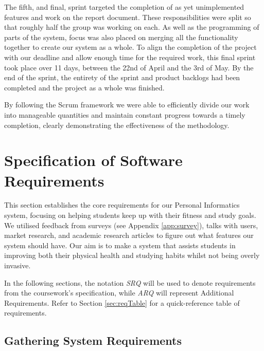 \documentclass[11pt]{article}
\begin{document}
The fifth, and final, sprint targeted the completion of as yet unimplemented
features and work on the report document. These responsibilities were split so
that roughly half the group was working on each. As well as the programming of
parts of the system, focus was also placed on merging all the functionality
together to create our system as a whole. To align the completion of the 
project with our deadline and allow enough time for the required work, this 
final sprint took place over 11 days, between the 22nd of April and the 3rd of 
May. By the end of the sprint, the entirety of the sprint and product 
backlogs had been completed and the project as a whole was finished.\par

By following the Scrum framework we were able to efficiently divide our work 
into manageable quantities and maintain constant progress towards a timely 
completion, clearly demonstrating the effectiveness of the methodology.\par

\section{Specification of Software Requirements}

This section establishes the core requirements for our Personal Informatics system, 
focusing on helping students keep up with their fitness and study
goals. We utilised feedback from surveys (see Appendix \ref{app:survey}), talks
with users, market research, and academic research articles to figure out what
features our system should have. Our aim is to make a system that assists
students in improving both their physical health and studying habits whilst not
being overly invasive.\par

In the following sections, the notation \textit{SRQ} will be used to denote
requirements from the coursework's specification, while \textit{ARQ} will
represent Additional Requirements. Refer to Section \ref{sec:reqTable} for a
quick-reference table of requirements.

\newpage

\subsection{Gathering System Requirements}
\end{document}
